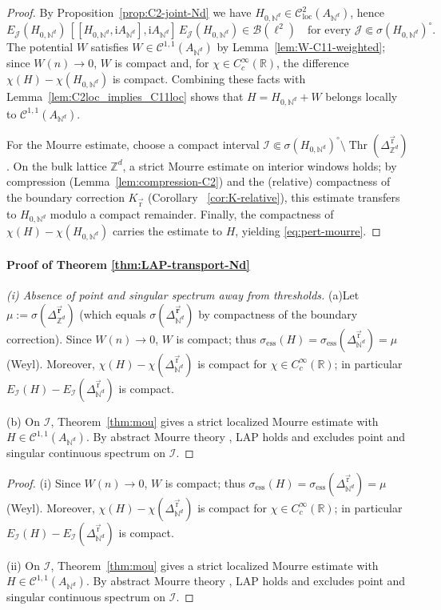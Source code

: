 \documentclass[10pt]{amsart}
\newcommand{\R}{{\mathbb{R}}}
\newcommand{\Z}{{\mathbb{Z}}}
\newcommand{\N}{{\mathbb{N}}}
\newcommand{\1}{{\mathbb{I}}}
\newcommand{\Bc}{\mathcal{B}}
\newcommand{\Cc}{\mathcal{C}}
\newcommand{\Ic}{\mathcal{I}}
\newcommand{\Jc}{\mathcal{J}}
\newcommand{\Thr}{\operatorname{Thr}}
\numberwithin{equation}{section}
\begin{document}
\begin{proof}
By Proposition~\ref{prop:C2-joint-Nd} we have $H_{0,\N^d}\in \mathcal{C}^{2}_{\mathrm{loc}}(A_{\N^d})$, hence
\[
E_\Jc(H_{0,\N^d})\,[[H_{0,\N^d},\mathrm i A_{\N^d}],\mathrm i A_{\N^d}]\,E_\Jc(H_{0,\N^d})\in\Bc(\ell^2)
\quad\text{for every }\Jc\Subset\sigma(H_{0,\N^d})^\circ.
\]
The potential $W$ satisfies $W\in\mathcal{C}^{1,1}(A_{\N^d})$ by Lemma~\ref{lem:W-C11-weighted}; since $W(n)\to0$, $W$ is compact and, for $\chi\in C_c^\infty(\R)$, the difference $\chi(H)-\chi(H_{0,\N^d})$ is compact. Combining these facts with Lemma~\ref{lem:C2loc_implies_C11loc} shows that $H=H_{0,\N^d}+W$ belongs locally to $\mathcal{C}^{1,1}(A_{\N^d})$.

For the Mourre estimate, choose a compact interval $\Ic\Subset\sigma(H_{0,\N^d})^\circ\setminus\Thr(\Delta_{\Z^d}^{\vec{\mathrm{r}}})$. On the bulk lattice $\Z^d$, a strict Mourre estimate on interior windows holds; by compression (Lemma~\ref{lem:compression-C2}) and the (relative) compactness of the boundary correction $K_{\vec{\mathrm{r}}}$ (Corollary ~\ref{cor:K-relative}), this estimate transfers to $H_{0,\N^d}$ modulo a compact remainder. Finally, the compactness of $\chi(H)-\chi(H_{0,\N^d})$ carries the estimate to $H$, yielding \eqref{eq:pert-mourre}.
\end{proof}
\paragraph{Proof of Theorem \ref{thm:LAP-transport-Nd}}
\begin{proof}[(i) Absence of point and singular spectrum away from thresholds]
(a)Let $\mu:=\sigma(\Delta_{\Z^d}^{\vec{\mathbf{r}}})$ (which equals $\sigma(\Delta_{\N^d}^{\vec{\mathbf{r}}})$ by compactness of the boundary correction). Since $W(n)\to0$, $W$ is compact; thus $\sigma_{\mathrm{ess}}(H)=\sigma_{\mathrm{ess}}(\Delta_{\N^d}^{\vec{\mathrm{r}}})=\mu$ (Weyl).
Moreover, $\chi(H)-\chi(\Delta_{\N^d}^{\vec{\mathrm{r}}})$ is compact for $\chi\in C_c^\infty(\R)$; in particular $E_\Ic(H)-E_\Ic(\Delta_{\N^d}^{\vec{\mathrm{r}}})$ is compact.

(b) On $\Ic$, Theorem~\ref{thm:mou} gives a strict localized Mourre estimate with $H\in\Cc^{1,1}(A_{\N^d})$.
By abstract Mourre theory \cite[Theorems.~7.4.1--7.4.2]{ABG}, LAP holds and excludes point and singular continuous spectrum on $\Ic$.
\end{proof}
\begin{proof}
(i) Since $W(n)\to0$, $W$ is compact; thus $\sigma_{\mathrm{ess}}(H)=\sigma_{\mathrm{ess}}(\Delta_{\N^d}^{\vec{\mathrm{r}}})=\mu$ (Weyl).
Moreover, $\chi(H)-\chi(\Delta_{\N^d}^{\vec{\mathrm{r}}})$ is compact for $\chi\in C_c^\infty(\R)$; in particular $E_\Ic(H)-E_\Ic(\Delta_{\N^d}^{\vec{\mathrm{r}}})$ is compact.

(ii) On $\Ic$, Theorem~\ref{thm:mou} gives a strict localized Mourre estimate with $H\in\Cc^{1,1}(A_{\N^d})$.
By abstract Mourre theory \cite[Theorems.~7.4.1--7.4.2]{ABG}, LAP holds and excludes point and singular continuous spectrum on $\Ic$.
\end{proof}
\end{document}
